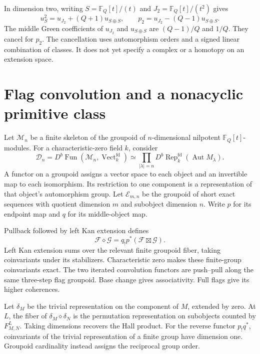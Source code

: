 In dimension two, writing $S=\mathbb F_Q[t]/(t)$ and
$J_2=\mathbb F_Q[t]/(t^2)$ gives
\[
 u_S^2=u_{J_2}+(Q+1)u_{S\oplus S},\qquad
 p_2=u_{J_2}-(Q-1)u_{S\oplus S}.
\]
The middle Green coefficients of $u_{J_2}$ and $u_{S\oplus S}$
are $(Q-1)/Q$ and $1/Q$. They cancel for $p_2$.
The cancellation uses automorphism orders and a signed linear
combination of classes. It does not yet specify a complex or a
homotopy on an extension space.

\section{Flag convolution and a nonacyclic primitive class}
\label{v4-arith:hall:sec:groupoids}

Let $\mathcal M_n$ be a finite skeleton of the groupoid of
$n$-dimensional nilpotent $\mathbb F_Q[t]$-modules.
For a characteristic-zero field $k$, consider
\[
 \mathscr D_n=D^b\operatorname{Fun}
       (\mathcal M_n,\operatorname{Vect}^{\mathrm{fd}}_k)
 \simeq\prod_{|\lambda|=n}
       D^b\operatorname{Rep}^{\mathrm{fd}}_k(\operatorname{Aut}M_\lambda).
\]
A functor on a groupoid assigns a vector space to each object and
an invertible map to each isomorphism. Its restriction to one
component is a representation of that object's automorphism group.
Let $\mathcal E_{m,n}$ be the groupoid of short exact sequences
with quotient dimension $m$ and subobject dimension $n$.
Write $p$ for its endpoint map and $q$ for its middle-object map.

Pullback followed by left Kan extension defines
\[
 \mathscr F\diamond\mathscr G
 =q_!p^*(\mathscr F\boxtimes\mathscr G).
\]
Left Kan extension sums over the relevant finite groupoid fiber,
taking coinvariants under its stabilizers. Characteristic zero makes
these finite-group coinvariants exact. The two iterated convolution
functors are push--pull along the same three-step flag groupoid.
Base change gives associativity. Full flags give its higher coherences.

Let $\delta_M$ be the trivial representation on the component of
$M$, extended by zero. At $L$, the fiber of
$\delta_M\diamond\delta_N$ is the permutation representation on
subobjects counted by $F^L_{M,N}$. Taking dimensions recovers the
Hall product. For the reverse functor $p_!q^*$, coinvariants of the trivial
representation of a finite group have dimension one. Groupoid
cardinality instead assigns the reciprocal group order.

